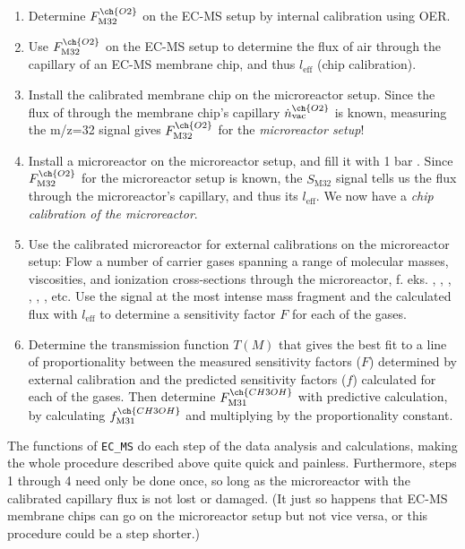 \begin{enumerate}
	\item Determine $F_\text{M32}^{\ch{O2}}$ on the EC-MS setup by internal calibration using OER. \label{step:meth1}
	
	\item Use $F_\text{M32}^{\ch{O2}}$ on the EC-MS setup to determine the flux of air through the capillary of an EC-MS membrane chip, and thus $l_\text{eff}$ (chip calibration). 
	
	\item Install the calibrated membrane chip on the microreactor setup. Since the flux of  through the membrane chip's capillary $\dot{n}_\text{vac}^{\ch{O2}}$ is known, measuring the m/z=32 signal gives $F_\text{M32}^{\ch{O2}}$ for the \textit{microreactor setup}!
	
	\item Install a microreactor on the microreactor setup, and fill it with 1 bar . Since $F_\text{M32}^{\ch{O2}}$ for the microreactor setup is known, the $S_\text{M32}$ signal tells us the  flux through the microreactor's capillary, and thus its $l_\text{eff}$. We now have a \textit{chip calibration of the microreactor}. \label{step:meth4}
	
	\item Use the calibrated microreactor for external calibrations on the microreactor setup: Flow a number of carrier gases spanning a range of molecular masses, viscosities, and ionization cross-sections through the microreactor, f. eks. , , , , , , etc. Use the signal at the most intense mass fragment and the calculated flux with $l_\text{eff}$ to determine a sensitivity factor $F$ for each of the gases.
	
	\item Determine the transmission function $T(M)$ that gives the best fit to a line of proportionality between the measured sensitivity factors ($F$) determined by external calibration and the predicted sensitivity factors ($f$) calculated for each of the gases. Then determine $F_\text{M31}^{\ch{CH3OH}}$ with predictive calculation, by calculating $f_\text{M31}^{\ch{CH3OH}}$ and multiplying by the proportionality constant.
\end{enumerate} The functions of \texttt{EC\_MS} do each step of the data analysis and calculations, making the whole procedure described above quite quick and painless. Furthermore, steps 1 through 4 need only be done once, so long as the microreactor with the calibrated capillary flux is not lost or damaged. (It just so happens that EC-MS membrane chips can go on the microreactor setup but not vice versa, or this procedure could be a step shorter.)
